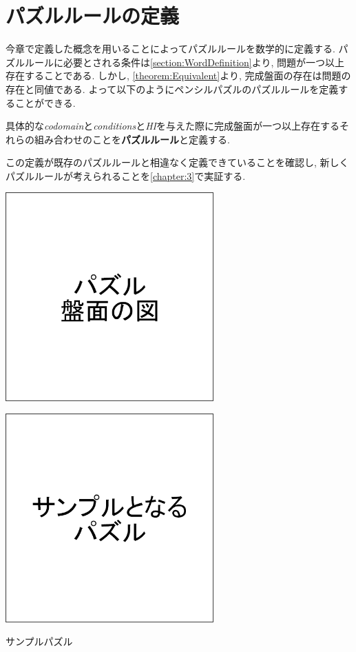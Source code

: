 \section{パズルルールの定義}
今章で定義した概念を用いることによってパズルルールを数学的に定義する. パズルルールに必要とされる条件は\cref{section:WordDefinition}より, 問題が一つ以上存在することである. しかし, \cref{theorem:Equivalent}より, 完成盤面の存在は問題の存在と同値である. よって以下のようにペンシルパズルのパズルルールを定義することができる.
\begin{definition}[パズルルール]\label{definition:PuzzleRule}
  具体的な\textit{codomain}と\textit{conditions}と\textit{HI}を与えた際に完成盤面が一つ以上存在するそれらの組み合わせのことを\textbf{パズルルール}と定義する.
\end{definition}
この定義が既存のパズルルールと相違なく定義できていることを確認し, 新しくパズルルールが考えられることを\cref{chapter:3}で実証する.





\begin{clearpagefigure}
  \includegraphics[width=8cm,clip]{fig/board.png}
  \caption{}
  \label{figure:Board}
\end{clearpagefigure}

\begin{clearpagefigure}
  \includegraphics[width=8cm,clip]{fig/samplePuzzle.png}
  \caption{サンプルパズル}
  \label{figure:SamplePuzzle}
\end{clearpagefigure}

